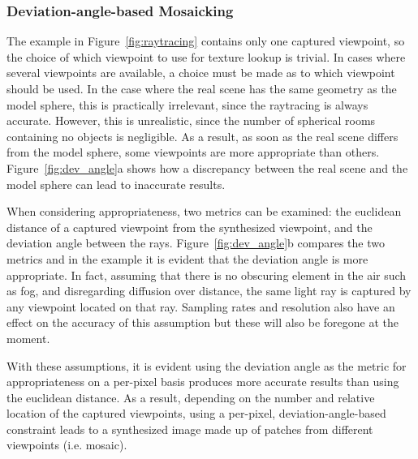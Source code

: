 

\subsubsection{Deviation-angle-based Mosaicking}
The example in Figure~\ref{fig:raytracing} contains only one captured viewpoint, so the choice of which viewpoint to use for texture lookup is trivial. In cases where several viewpoints are available, a choice must be made as to which viewpoint should be used. In the case where the real scene has the same geometry as the model sphere, this is practically irrelevant, since the raytracing is always accurate. However, this is unrealistic, since the number of spherical rooms containing no objects is negligible. As a result, as soon as the real scene differs from the model sphere, some viewpoints are more appropriate than others. Figure~\ref{fig:dev_angle}a shows how a discrepancy between the real scene and the model sphere can lead to inaccurate results.

When considering appropriateness, two metrics can be examined: the euclidean distance of a captured viewpoint from the synthesized viewpoint, and the deviation angle between the rays. Figure~\ref{fig:dev_angle}b compares the two metrics and in the example it is evident that the deviation angle is more appropriate. In fact, assuming that there is no obscuring element in the air such as fog, and disregarding diffusion over distance, the same light ray is captured by any viewpoint located on that ray. Sampling rates and resolution also have an effect on the accuracy of this assumption but these will also be foregone at the moment.

With these assumptions, it is evident using the deviation angle as the metric for appropriateness on a per-pixel basis produces more accurate results than using the euclidean distance. As a result, depending on the number and relative location of the captured viewpoints, using a per-pixel, deviation-angle-based constraint leads to a synthesized image made up of patches from different viewpoints (i.e. mosaic). 

